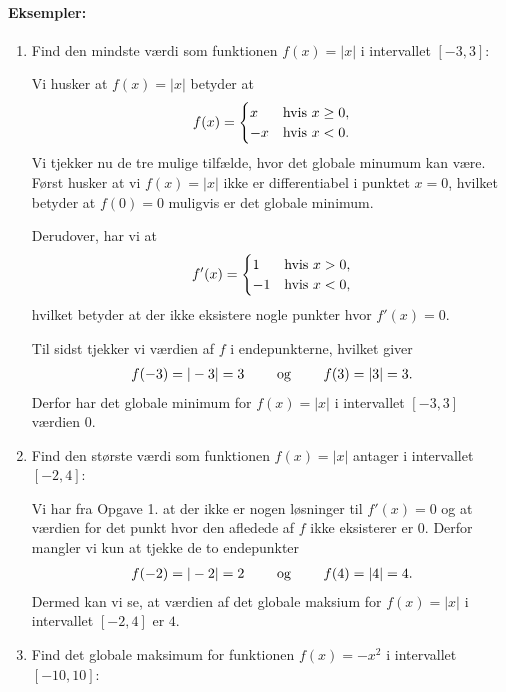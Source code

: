 \paragraph*{Eksempler:}
\begin{enumerate}
\item Find den mindste værdi som funktionen $f(x)=\vert x \vert$ i intervallet $[-3,3]$:

Vi husker at $f(x)=\vert x \vert$ betyder at
\begin{align*}
f(x) = \begin{cases}
x & \textup{hvis } x \geq 0,\\
-x & \textup{hvis } x < 0.
\end{cases}
\end{align*}
Vi tjekker nu de tre mulige tilfælde, hvor det globale minumum kan være. Først husker at vi $f(x)=\vert x \vert$ ikke er differentiabel i punktet $x=0$, hvilket betyder at $f(0)=0$ muligvis er det globale minimum.

Derudover, har vi at 
\begin{align*}
f'(x)= \begin{cases}
1 & \textup{hvis } x > 0, \\
-1 & \textup{hvis } x < 0,
\end{cases}
\end{align*}
hvilket betyder at der ikke eksistere nogle punkter hvor $f'(x)=0$.

Til sidst tjekker vi værdien af $f$ i endepunkterne, hvilket giver
\begin{align*}
f(-3)=\vert -3 \vert = 3 \qquad \textup{ og } \qquad f(3)=\vert 3 \vert = 3.
\end{align*}
Derfor har det globale minimum for $f(x)=\vert x \vert$ i intervallet $[-3,3]$ værdien $0$.
\item Find den største værdi som funktionen $f(x)=\vert x \vert$ antager i intervallet $[-2,4]$:

Vi har fra Opgave 1. at der ikke er nogen løsninger til $f'(x)=0$ og at værdien for det punkt hvor den afledede af $f$ ikke eksisterer er $0$. Derfor mangler vi kun at tjekke de to endepunkter
\begin{align*}
f(-2) = \vert -2 \vert = 2 \qquad \textup{ og } \qquad f(4) = \vert 4 \vert =4.
\end{align*}
Dermed kan vi se, at værdien af det globale maksium for $f(x)=\vert x \vert$ i intervallet $[-2,4]$ er $4$.
\item Find det globale maksimum for funktionen $f(x)=-x^2$ i intervallet $[-10,10]$:


\end{enumerate}
